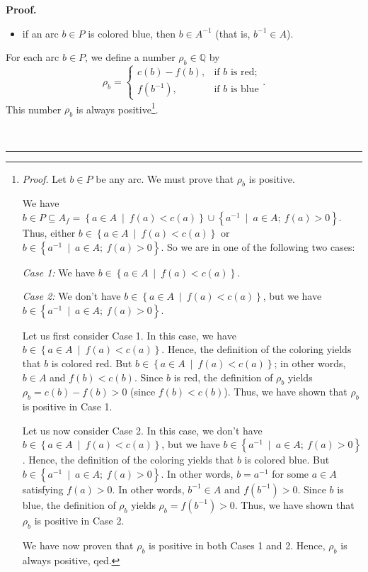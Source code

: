 \documentclass[numbers=enddot,12pt,final,onecolumn,notitlepage]{scrartcl}%
\theoremstyle{definition}
\newenvironment{proof}[1][Proof]{\noindent\textbf{#1.} }{\ \rule{0.5em}{0.5em}}
\begin{document}
\begin{proof}
\begin{itemize}
\item if an arc $b\in P$ is colored blue, then $b\in A^{-1}$ (that is,
$b^{-1}\in A$).
\end{itemize}

For each arc $b\in P$, we define a number $\rho_{b}\in\mathbb{Q}$ by%
\[
\rho_{b}=%
\begin{cases}
c\left(  b\right)  -f\left(  b\right)  , & \text{if }b\text{ is red};\\
f\left(  b^{-1}\right)  , & \text{if }b\text{ is blue}%
\end{cases}
.
\]
This number $\rho_{b}$ is always positive\footnote{\textit{Proof.} Let $b\in
P$ be any arc. We must prove that $\rho_{b}$ is positive.
\par
We have $b\in P\subseteq A_{f}=\left\{  a\in A\ \mid\ f\left(  a\right)
<c\left(  a\right)  \right\}  \cup\left\{  a^{-1}\ \mid\ a\in A;\ f\left(
a\right)  >0\right\}  $. Thus, either $b\in\left\{  a\in A\ \mid\ f\left(
a\right)  <c\left(  a\right)  \right\}  $ or $b\in\left\{  a^{-1}\ \mid\ a\in
A;\ f\left(  a\right)  >0\right\}  $. So we are in one of the following two
cases:
\par
\textit{Case 1:} We have $b\in\left\{  a\in A\ \mid\ f\left(  a\right)
<c\left(  a\right)  \right\}  $.
\par
\textit{Case 2:} We don't have $b\in\left\{  a\in A\ \mid\ f\left(  a\right)
<c\left(  a\right)  \right\}  $, but we have $b\in\left\{  a^{-1}\ \mid\ a\in
A;\ f\left(  a\right)  >0\right\}  $.
\par
Let us first consider Case 1. In this case, we have $b\in\left\{  a\in
A\ \mid\ f\left(  a\right)  <c\left(  a\right)  \right\}  $. Hence, the
definition of the coloring yields that $b$ is colored red. But $b\in\left\{
a\in A\ \mid\ f\left(  a\right)  <c\left(  a\right)  \right\}  $; in other
words, $b\in A$ and $f\left(  b\right)  <c\left(  b\right)  $. Since $b$ is
red, the definition of $\rho_{b}$ yields $\rho_{b}=c\left(  b\right)
-f\left(  b\right)  >0$ (since $f\left(  b\right)  <c\left(  b\right)  $).
Thus, we have shown that $\rho_{b}$ is positive in Case 1.
\par
Let us now consider Case 2. In this case, we don't have $b\in\left\{  a\in
A\ \mid\ f\left(  a\right)  <c\left(  a\right)  \right\}  $, but we have
$b\in\left\{  a^{-1}\ \mid\ a\in A;\ f\left(  a\right)  >0\right\}  $. Hence,
the definition of the coloring yields that $b$ is colored blue. But
$b\in\left\{  a^{-1}\ \mid\ a\in A;\ f\left(  a\right)  >0\right\}  $. In
other words, $b=a^{-1}$ for some $a\in A$ satisfying $f\left(  a\right)  >0$.
In other words, $b^{-1}\in A$ and $f\left(  b^{-1}\right)  >0$. Since $b$ is
blue, the definition of $\rho_{b}$ yields $\rho_{b}=f\left(  b^{-1}\right)
>0$. Thus, we have shown that $\rho_{b}$ is positive in Case 2.
\par
We have now proven that $\rho_{b}$ is positive in both Cases 1 and 2. Hence,
$\rho_{b}$ is always positive, qed.}.


\end{proof}
\end{document}
